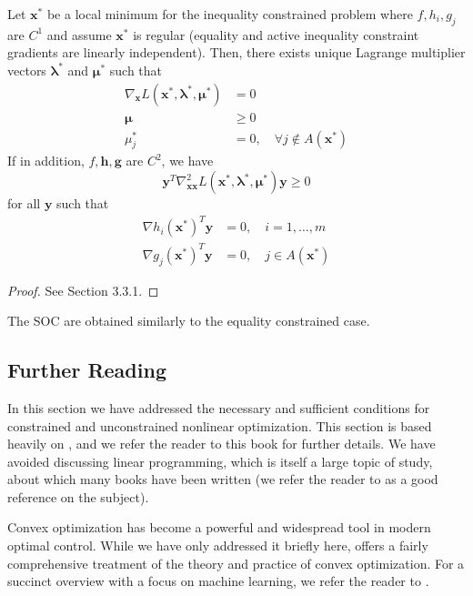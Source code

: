 \begin{theorem}
Let $\bm{x}^*$ be a local minimum for the inequality constrained problem where $f, h_i, g_j$ are $C^1$ and assume $\bm{x}^*$ is regular (equality and active inequality constraint gradients are linearly independent). Then, there exists unique Lagrange multiplier vectors $\bm{\lambda}^*$ and $\bm{\mu}^*$ such that
\begin{align}
    \nabla_{\bm{x}} L(\bm{x}^*,\bm{\lambda}^*, \bm{\mu}^*) &= 0\\
    \bm{\mu} &\geq 0\\
    \mu_j^* &= 0, \quad \forall j \notin A(\bm{x}^*)
\end{align}
If in addition, $f,\bm{h},\bm{g}$ are $C^2$, we have 
\begin{equation}
    \bm{y}^T \nabla^2_{\bm{xx}} L(\bm{x}^*,\bm{\lambda}^*, \bm{\mu}^*) \bm{y} \geq 0 
\end{equation}
for all $\bm{y}$ such that 
\begin{align}
    \nabla h_i(\bm{x}^*)^T \bm{y} &=0, \quad i = 1, \ldots, m\\
    \nabla g_j(\bm{x}^*)^T \bm{y} &=0, \quad j \in A(\bm{x}^*)
\end{align}
\end{theorem}

\begin{proof}
See \cite{bertsekas2016nonlinear} Section 3.3.1.
\end{proof}

The SOC are obtained similarly to the equality constrained case. 



\subsection{Further Reading}

In this section we have addressed the necessary and sufficient conditions for constrained and unconstrained nonlinear optimization. This section is based heavily on \cite{bertsekas2016nonlinear}, and we refer the reader to this book for further details. We have avoided discussing linear programming, which is itself a large topic of study, about which many books have been written (we refer the reader to \cite{bertsimas1997introduction} as a good reference on the subject). 

Convex optimization has become a powerful and widespread tool in modern optimal control. While we have only addressed it briefly here, \cite{boyd2004convex} offers a fairly comprehensive treatment of the theory and practice of convex optimization. For a succinct overview with a focus on machine learning, we refer the reader to \cite{kolter2008convex}.
